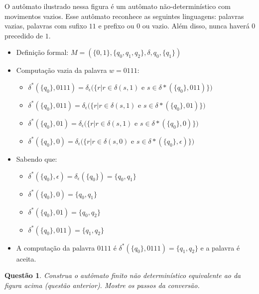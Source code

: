 \documentclass{article}
\newtheorem{problem}{Questão}
\begin{document}
\begin{solution} O autômato ilustrado nessa figura é um autômato não-determinístico com movimentos vazios. Esse autômato reconhece as seguintes linguagens: palavras vazias, palavras com sufixo $11$ e prefixo ou $0$ ou vazio. Além disso, nunca haverá $0$ precedido de $1$.
\begin{itemize}
    \item Definição formal: $M = (\{0,1\}, \{q_0, q_1, q_2\}, \delta, q_0, \{q_1\})$
    \item Computação vazia da palavra $w = 0111$:
    \begin{itemize}
        \item $\delta^{*}(\{q_0\},0111) = \delta_{\epsilon}(\{ r | r \in \delta(s, 1)$ e $s \in \delta*(\{ q_0 \}, 011)\})$
        \item $\delta^{*}(\{q_0\},011) = \delta_{\epsilon}(\{ r | r \in \delta(s, 1)$ e $s \in \delta*(\{ q_0 \}, 01)\})$
        \item $\delta^{*}(\{q_0\},01) = \delta_{\epsilon}(\{ r | r \in \delta(s, 1)$ e $s \in \delta*(\{ q_0 \}, 0)\})$
        \item $\delta^{*}(\{q_0\},0) = \delta_{\epsilon}(\{ r | r \in \delta(s, 0)$ e $s \in \delta*(\{ q_0 \}, \epsilon)\})$
    \end{itemize}
    \item Sabendo que:
    \begin{itemize}
        \item $\delta^{*}(\{q_0\},\epsilon) = \delta_{\epsilon}(\{q_0\}) = \{q_0, q_1\}$
        \item $\delta^{*}(\{q_0\},0) = \{q_0, q_1\}$
        \item $\delta^{*}(\{q_0\},01) = \{q_0, q_2\}$
        \item $\delta^{*}(\{q_0\},011) = \{q_1, q_2\}$
    \end{itemize}
    \item A computação da palavra $0111$ é $\delta^{*}(\{q_0\},0111) = \{q_1, q_2\}$ e a palavra é aceita.
\end{itemize}
\end{solution}
    
\begin{problem} Construa o autômato finito não determinístico equivalente ao da figura acima (questão anterior). Mostre os passos da
conversão.
\end{problem}    
\end{document}
